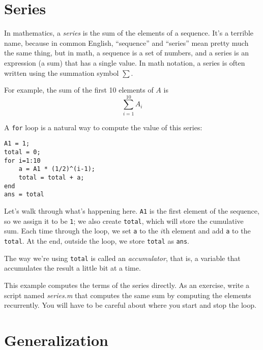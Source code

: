 \section{Series}
\label{series}

In mathematics, a \emph{series} is the sum of the elements of
a sequence.  It's a terrible name, because in common English,
``sequence'' and ``series'' mean pretty much the same thing, but in
math, a sequence is a set of numbers, and a series is an expression
(a sum) that has a single value.  In math notation,  a series
is often written using the summation symbol $\sum$.


For example, the sum of the first 10 elements of $A$ is
\begin{equation*}
\sum_{i=1}^{10} A_i
\end{equation*}

A \lstinline{for} loop is a natural way to compute the value of this series:

\begin{lstlisting}[caption={A program that calculates a simple series}, label={lst:series_10}]
A1 = 1;
total = 0;
for i=1:10
    a = A1 * (1/2)^(i-1);
    total = total + a;
end
ans = total
\end{lstlisting}

Let's walk through what's happening here. \lstinline{A1} is the first element of the sequence, so we assign it to be \lstinline{1}; we also create \lstinline{total}, which will store the cumulative sum.
Each time through the loop, we set \lstinline{a} to the $i$th element and add \lstinline{a} to the \lstinline{total}.
At the end, outside the loop, we store  \lstinline{total} as \lstinline{ans}.

The way we're using \lstinline{total} is called an \emph{accumulator}, that is, a variable that accumulates the result a little bit at a time.



\begin{ex}
This example computes the terms of the series directly. As
an exercise, write a script named \emph{series.m} that computes
the same sum by computing the elements recurrently.  You will
have to be careful about where you start and stop the loop.
\end{ex}


\section{Generalization}

